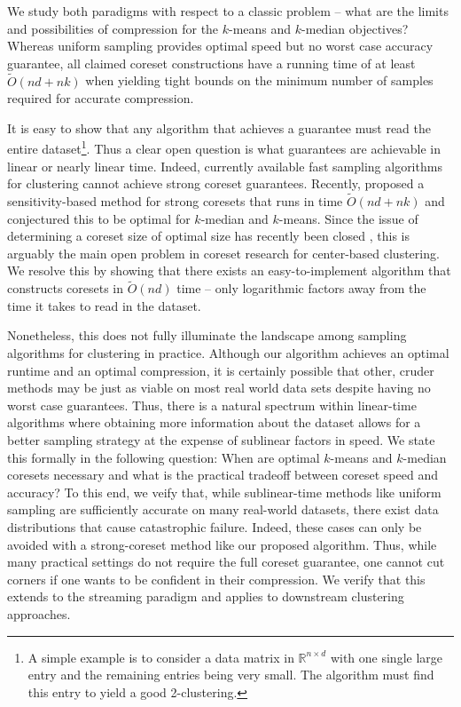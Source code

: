 We study both paradigms with respect to a classic problem -- what are the limits and possibilities of compression for the $k$-means and $k$-median objectives?
Whereas uniform sampling provides optimal speed but no worst case accuracy guarantee, all claimed coreset constructions have a running time of at least
$\tilde{O}(nd+nk)$ when yielding tight bounds on the minimum number of samples required for accurate compression. 

It is easy to show that any algorithm that achieves a guarantee must read the entire dataset\footnote{A simple example is to consider a data matrix in
$\mathbb{R}^{n \times d}$ with one single large entry and the remaining entries being very small. The algorithm must find this entry to yield a good
2-clustering.}. Thus a clear open question is what guarantees are achievable in linear or nearly linear time. Indeed, currently available fast sampling
algorithms for clustering \cite{BachemL018} \cite{kmeans_sublinear_bachem16} cannot achieve strong coreset guarantees.  Recently, \cite{DSWY22} proposed
a sensitivity-based method for strong coresets that runs in time $\tilde{O}(nd + nk)$ and conjectured this to be optimal for $k$-median and $k$-means.  Since
the issue of determining a coreset size of optimal size has recently been closed \cite{CSS21,CLSSS22,HLW23}, this is arguably the main open problem in coreset
research for center-based clustering. We resolve this by showing that there exists an easy-to-implement algorithm that constructs coresets in $\tilde{O}(nd)$
time -- only logarithmic factors away from the time it takes to read in the dataset.

Nonetheless, this does not fully illuminate the landscape among sampling algorithms for clustering in practice. Although our algorithm achieves an optimal
runtime and an optimal compression, it is certainly possible that other, cruder methods may be just as viable on most real world data sets despite having no
worst case guarantees.  Thus, there is a natural spectrum within linear-time algorithms where obtaining more information about the dataset allows for a better
sampling strategy at the expense of sublinear factors in speed. We state this formally in the following question: When are optimal $k$-means and $k$-median
coresets necessary and what is the practical tradeoff between coreset speed and accuracy? To this end, we veify that, while sublinear-time methods like uniform
sampling are sufficiently accurate on many real-world datasets, there exist data distributions that cause catastrophic failure. Indeed, these cases can only be
avoided with a strong-coreset method like our proposed algorithm. Thus, while many practical settings do not require the full coreset guarantee, one cannot cut
corners if one wants to be confident in their compression. We verify that this extends to the streaming paradigm and applies to downstream clustering
approaches.

